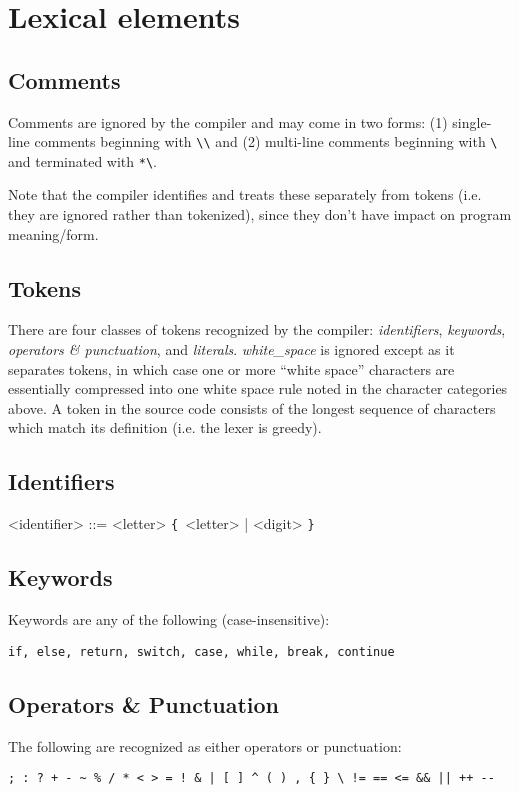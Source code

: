 \documentclass{article}
\def\lrep{\synshortsoff\texttt{\{}\synshorts~}
\def\rrep{\synshortsoff\texttt{\}}\synshorts~}
\begin{document}
\section*{Lexical elements}
\subsection*{Comments}
Comments are ignored by the compiler and may come in two forms: (1)
single-line comments beginning with
\texttt{\textbackslash\textbackslash} and (2) multi-line comments
beginning with \texttt{\textbackslash*} and terminated with
\texttt{*\textbackslash}.

Note that the compiler identifies and treats these separately from
tokens (i.e. they are ignored rather than tokenized), since they don't
have impact on program meaning/form.

\subsection*{Tokens}
There are four classes of tokens recognized by the compiler:
\emph{identifiers}, \emph{keywords}, \emph{operators \& punctuation},
and \emph{literals}. \emph{white\_space} is ignored except as it
separates tokens, in which case one or more ``white space'' characters
are essentially compressed into one white space rule noted in the
character categories above. A token in the source code consists of the
longest sequence of characters which match its definition (i.e. the
lexer is greedy).

\subsection*{Identifiers}
\begin{grammar}
  <identifier> ::= <letter> \lrep <letter> | <digit> \rrep
\end{grammar}

\subsection*{Keywords}
Keywords are any of the following (case-insensitive):
\begin{verbatim}
if, else, return, switch, case, while, break, continue
\end{verbatim}

\subsection*{Operators \& Punctuation}
The following are recognized as either operators or punctuation:
\begin{verbatim}
; : ? + - ~ % / * < > = ! & | [ ] ^ ( ) , { } \ != == <= && || ++ --
\end{verbatim}
\end{document}
